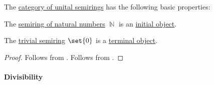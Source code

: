\begin{proposition}\label{thm:category_of_semirings_properties}
  The \hyperref[def:semiring/category]{category of unital semirings} has the following basic properties:
  \begin{thmenum}
     The \hyperref[def:integers]{semiring of natural numbers} \( \BbbN \) is an \hyperref[def:universal_objects/initial]{initial object}.

     The \hyperref[def:semiring/trivial]{trivial semiring} \( \set{ 0 } \) is a \hyperref[def:universal_objects/terminal]{terminal object}.
  \end{thmenum}
\end{proposition}
\begin{proof}
   Follows from .
   Follows from .
\end{proof}

\paragraph{Divisibility}

